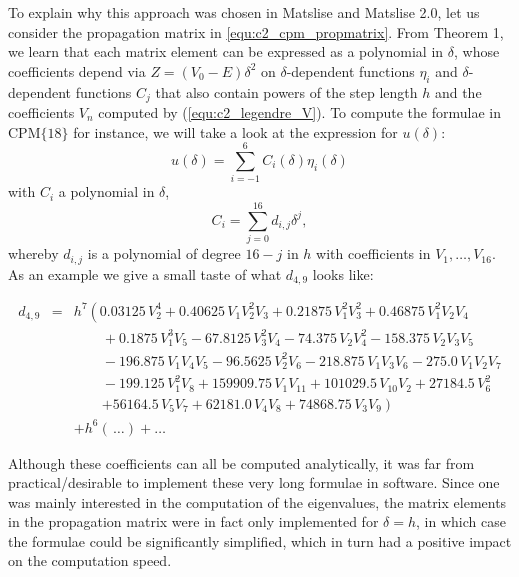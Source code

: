 To explain why this approach was chosen in Matslise and Matslise 2.0, let us consider the propagation matrix in \eqref{equ:c2_cpm_propmatrix}. From Theorem 1, we learn that each matrix element can be expressed as a polynomial in $\delta$, whose coefficients depend
via $Z=(V_0-E) \delta^2$ on $\delta$-dependent functions $\eta_i$ and $\delta$-dependent functions $C_j$ that also contain powers of the step length $h$ and the coefficients $V_n$ computed by (\ref{equ:c2_legendre_V}). To compute the formulae in $\text{CPM}\{18\}$ for instance, we will take a look at the expression for $u(\delta)$:
$$
    u(\delta) = \sum_{i = -1}^6 C_i(\delta) \eta_{i}(\delta)
$$
with $C_i$ a polynomial in $\delta$,
$$
    C_i  = \sum_{j=0}^{16} d_{i, j} \delta^j,
$$
whereby $d_{i, j}$ is a polynomial of degree $16-j$ in $h$ with coefficients in $V_1, \dots, V_{16}$. As an example we give a small taste of what $d_{4, 9}$ looks like:

\begin{eqnarray*}
    d_{4, 9}& =&  h^7 \left (0.03125 \, V_{2}^{4} + 0.40625 \, V_{1} V_{2}^{2} V_{3} + 0.21875 \, V_{1}^{2} V_{3}^{2} + 0.46875 \, V_{1}^{2} V_{2} V_{4} \right. \\
    &  & \qquad + 0.1875 \, V_{1}^{3} V_{5} - 67.8125 \, V_{3}^{2} V_{4} - 74.375 \, V_{2} V_{4}^{2} - 158.375 \, V_{2} V_{3} V_{5}         \\
    &  & \qquad - 196.875 \, V_{1} V_{4} V_{5} - 96.5625 \, V_{2}^{2} V_{6} - 218.875 \, V_{1} V_{3} V_{6} - 275.0 \, V_{1} V_{2} V_{7}     \\
    &  & \qquad - 199.125 \, V_{1}^{2} V_{8} + 159909.75 \, V_{1} V_{11} + 101029.5 \, V_{10} V_{2} + 27184.5 \, V_{6}^{2}                  \\
    &  & \qquad \left.+ 56164.5 \, V_{5} V_{7} + 62181.0 \, V_{4} V_{8} + 74868.75 \, V_{3} V_{9} \right)                                                 \\
    &  & + h^6 (\,\dots)  + \dots
\end{eqnarray*}


Although these coefficients can all be computed analytically, it was far from practical/desirable to implement these very long formulae in software. Since one was mainly interested in the computation of
the eigenvalues, the matrix elements in the propagation matrix were in fact only implemented for $\delta=h$, in which case the formulae could be significantly simplified, which in turn had a positive impact on the computation speed.

